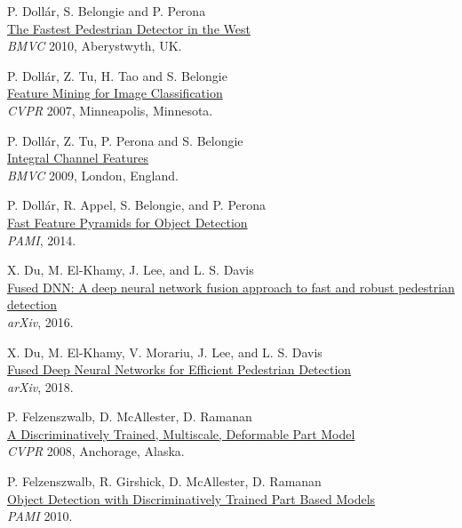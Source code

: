 \documentclass[onecolumn]{article}
\begin{document}
\begin{thebibliography}{1}
P. Doll\'ar, S. Belongie and P. Perona\\
\href{http://vision.ucsd.edu/~pdollar/research.html}{
The Fastest Pedestrian Detector in the West}\\
\textit{BMVC} 2010, Aberystwyth, UK.

P. Doll\'ar, Z. Tu, H. Tao and S. Belongie\\
\href{http://vision.ucsd.edu/~pdollar/research.html}{
Feature Mining for Image Classification}\\
\textit{CVPR} 2007, Minneapolis, Minnesota.

P. Doll\'ar, Z. Tu, P. Perona and S. Belongie\\
\href{http://vision.ucsd.edu/~pdollar/research.html}{
Integral Channel Features}\\
\textit{BMVC} 2009, London, England.

P. Doll\'ar, R. Appel, S. Belongie, and P. Perona\\
\href{http://vision.ucsd.edu/~pdollar/files/papers/DollarPAMI14pyramids.pdf}{
Fast Feature Pyramids for Object Detection }\\
\textit{PAMI}, 2014.

X. Du, M. El-Khamy, J. Lee, and L. S. Davis\\
\href{https://arxiv.org/abs/1610.03466}{
Fused DNN: A deep neural network fusion approach to fast and robust pedestrian detection}\\
\textit{arXiv}, 2016.

X. Du, M. El-Khamy, V. Morariu, J. Lee, and L. S. Davis\\
\href{https://arxiv.org/abs/1805.08688}{
Fused Deep Neural Networks for Efficient Pedestrian Detection}\\
\textit{arXiv}, 2018.

P. Felzenszwalb, D. McAllester, D. Ramanan\\
\href{http://www.cs.berkeley.edu/~rbg/latent}{
A Discriminatively Trained, Multiscale, Deformable Part Model}\\
\textit{CVPR} 2008, Anchorage, Alaska.

P. Felzenszwalb, R. Girshick, D. McAllester, D. Ramanan\\
\href{http://www.cs.berkeley.edu/~rbg/latent}{
Object Detection with Discriminatively Trained Part Based Models}\\
\textit{PAMI} 2010.


\end{thebibliography}
\end{document}
